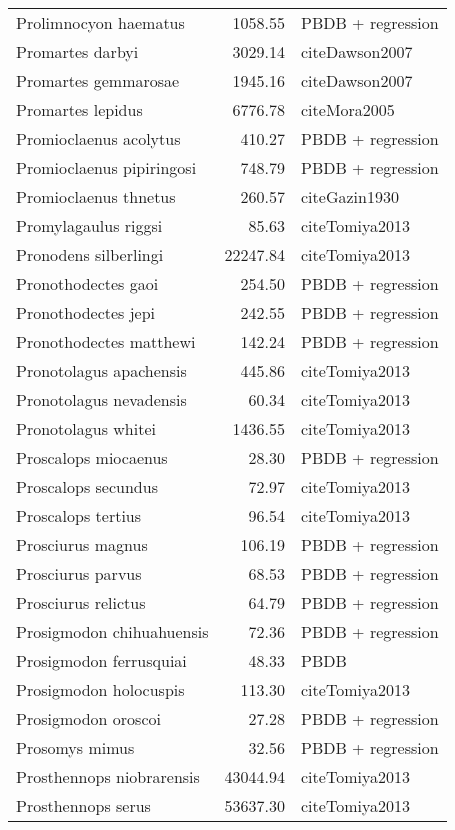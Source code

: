 \begin{table}[ht]
\begin{tabular}{lrl}
  Prolimnocyon haematus & 1058.55 & PBDB + regression \\ 
  Promartes darbyi & 3029.14 & cite{Dawson2007} \\ 
  Promartes gemmarosae & 1945.16 & cite{Dawson2007} \\ 
  Promartes lepidus & 6776.78 & cite{Mora2005} \\ 
  Promioclaenus acolytus & 410.27 & PBDB + regression \\ 
  Promioclaenus pipiringosi & 748.79 & PBDB + regression \\ 
  Promioclaenus thnetus & 260.57 & cite{Gazin1930} \\ 
  Promylagaulus riggsi & 85.63 & cite{Tomiya2013} \\ 
  Pronodens silberlingi & 22247.84 & cite{Tomiya2013} \\ 
  Pronothodectes gaoi & 254.50 & PBDB + regression \\ 
  Pronothodectes jepi & 242.55 & PBDB + regression \\ 
  Pronothodectes matthewi & 142.24 & PBDB + regression \\ 
  Pronotolagus apachensis & 445.86 & cite{Tomiya2013} \\ 
  Pronotolagus nevadensis & 60.34 & cite{Tomiya2013} \\ 
  Pronotolagus whitei & 1436.55 & cite{Tomiya2013} \\ 
  Proscalops miocaenus & 28.30 & PBDB + regression \\ 
  Proscalops secundus & 72.97 & cite{Tomiya2013} \\ 
  Proscalops tertius & 96.54 & cite{Tomiya2013} \\ 
  Prosciurus magnus & 106.19 & PBDB + regression \\ 
  Prosciurus parvus & 68.53 & PBDB + regression \\ 
  Prosciurus relictus & 64.79 & PBDB + regression \\ 
  Prosigmodon chihuahuensis & 72.36 & PBDB + regression \\ 
  Prosigmodon ferrusquiai & 48.33 & PBDB \\ 
  Prosigmodon holocuspis & 113.30 & cite{Tomiya2013} \\ 
  Prosigmodon oroscoi & 27.28 & PBDB + regression \\ 
  Prosomys mimus & 32.56 & PBDB + regression \\ 
  Prosthennops niobrarensis & 43044.94 & cite{Tomiya2013} \\ 
  Prosthennops serus & 53637.30 & cite{Tomiya2013} \\ 

\end{tabular}
\end{table}
